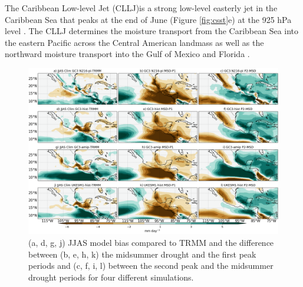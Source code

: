 The Caribbean Low-level Jet (CLLJ)is a strong low-level easterly jet in the Caribbean Sea that peaks at the end of June (Figure \ref{fig:csst}e) at the 925 hPa level \citep{amador2008,herrera2015,maldonado2016}. The CLLJ  determines the moisture transport from the Caribbean Sea into the eastern Pacific across the Central American landmass as well as the northward moisture transport into the Gulf of Mexico and Florida \citep{munoz2008,hidalgo2015,maldonado2016}.






\begin{figure}[t!]
\includegraphics[width=\linewidth]{figures/fig2obs_prmodels3.png}
\caption{ (a, d, g, j) JJAS model bias compared to TRMM and the difference between  (b, e, h, k)  the midsummer drought and the first peak periods and (c, f, i, l)  between the second peak and the midsummer drought periods for four different simulations.}
\label{fig:eof2}
\end{figure}


